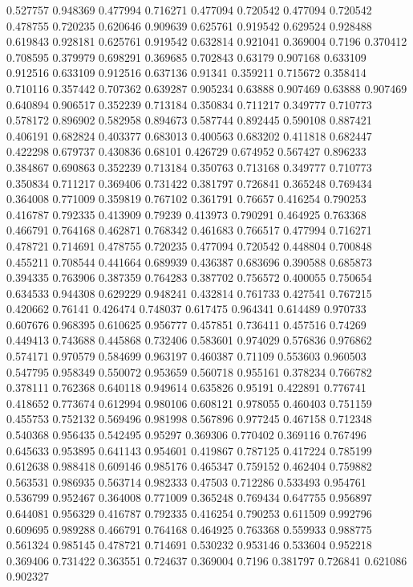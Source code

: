 0.527757 0.948369
0.477994 0.716271
0.477094 0.720542
0.477094 0.720542
0.478755 0.720235
0.620646 0.909639
0.625761 0.919542
0.629524 0.928488
0.619843 0.928181
0.625761 0.919542
0.632814 0.921041
0.369004 0.7196
0.370412 0.708595
0.379979 0.698291
0.369685 0.702843
0.63179 0.907168
0.633109 0.912516
0.633109 0.912516
0.637136 0.91341
0.359211 0.715672
0.358414 0.710116
0.357442 0.707362
0.639287 0.905234
0.63888 0.907469
0.63888 0.907469
0.640894 0.906517
0.352239 0.713184
0.350834 0.711217
0.349777 0.710773
0.578172 0.896902
0.582958 0.894673
0.587744 0.892445
0.590108 0.887421
0.406191 0.682824
0.403377 0.683013
0.400563 0.683202
0.411818 0.682447
0.422298 0.679737
0.430836 0.68101
0.426729 0.674952
0.567427 0.896233
0.384867 0.690863
0.352239 0.713184
0.350763 0.713168
0.349777 0.710773
0.350834 0.711217
0.369406 0.731422
0.381797 0.726841
0.365248 0.769434
0.364008 0.771009
0.359819 0.767102
0.361791 0.76657
0.416254 0.790253
0.416787 0.792335
0.413909 0.79239
0.413973 0.790291
0.464925 0.763368
0.466791 0.764168
0.462871 0.768342
0.461683 0.766517
0.477994 0.716271
0.478721 0.714691
0.478755 0.720235
0.477094 0.720542
0.448804 0.700848
0.455211 0.708544
0.441664 0.689939
0.436387 0.683696
0.390588 0.685873
0.394335 0.763906
0.387359 0.764283
0.387702 0.756572
0.400055 0.750654
0.634533 0.944308
0.629229 0.948241
0.432814 0.761733
0.427541 0.767215
0.420662 0.76141
0.426474 0.748037
0.617475 0.964341
0.614489 0.970733
0.607676 0.968395
0.610625 0.956777
0.457851 0.736411
0.457516 0.74269
0.449413 0.743688
0.445868 0.732406
0.583601 0.974029
0.576836 0.976862
0.574171 0.970579
0.584699 0.963197
0.460387 0.71109
0.553603 0.960503
0.547795 0.958349
0.550072 0.953659
0.560718 0.955161
0.378234 0.766782
0.378111 0.762368
0.640118 0.949614
0.635826 0.95191
0.422891 0.776741
0.418652 0.773674
0.612994 0.980106
0.608121 0.978055
0.460403 0.751159
0.455753 0.752132
0.569496 0.981998
0.567896 0.977245
0.467158 0.712348
0.540368 0.956435
0.542495 0.95297
0.369306 0.770402
0.369116 0.767496
0.645633 0.953895
0.641143 0.954601
0.419867 0.787125
0.417224 0.785199
0.612638 0.988418
0.609146 0.985176
0.465347 0.759152
0.462404 0.759882
0.563531 0.986935
0.563714 0.982333
0.47503 0.712286
0.533493 0.954761
0.536799 0.952467
0.364008 0.771009
0.365248 0.769434
0.647755 0.956897
0.644081 0.956329
0.416787 0.792335
0.416254 0.790253
0.611509 0.992796
0.609695 0.989288
0.466791 0.764168
0.464925 0.763368
0.559933 0.988775
0.561324 0.985145
0.478721 0.714691
0.530232 0.953146
0.533604 0.952218
0.369406 0.731422
0.363551 0.724637
0.369004 0.7196
0.381797 0.726841
0.621086 0.902327
